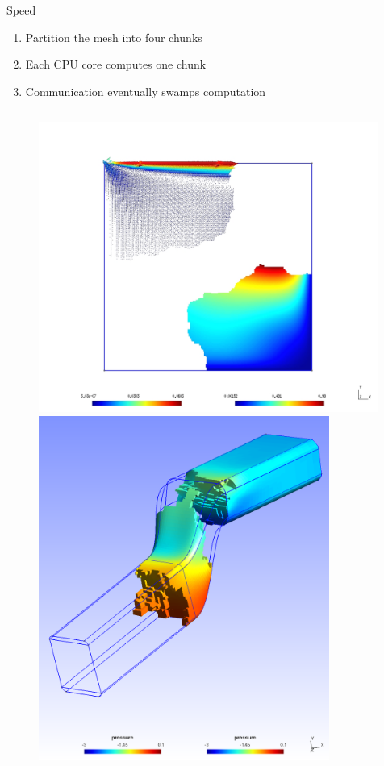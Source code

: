 \documentclass[xcolor=dvipsnames]{beamer}
\begin{document}
\begin{frame}{Speed}
  \begin{enumerate}
  \item Partition the mesh into four chunks
  \item Each CPU core computes one chunk
  \item Communication eventually swamps computation
  \end{enumerate}
\begin{figure}
  \centering
  \begin{columns}
    \centering
    \includegraphics[width=0.99\textwidth]{cavity_2dp_tet_fine}
    \centering
    \includegraphics[width=0.85\textwidth]{duct_3d_4p}
  \end{columns}
\end{figure}
\end{frame}
\end{document}
